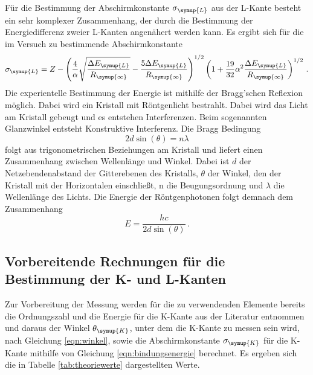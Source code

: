 Für die Bestimmung der Abschirmkonstante $\sigma_{\symup{L}}$ aus der L-Kante besteht ein
sehr komplexer Zusammenhang, der durch die Bestimmung der Energiedifferenz zweier
L-Kanten angenähert werden kann. Es ergibt sich für die im Versuch zu bestimmende
Abschirmkonstante
\begin{equation}
  \sigma_{\symup{L}}=Z-\left(\frac{4}{\alpha} \sqrt{\frac{\Delta E_{\symup{L}}}{R_{\symup{\infty}}}}
  -\frac{5\Delta E_{\symup{L}}}{R_{\symup{\infty}}}\right)^{1/2}
  \left(1+\frac{19}{32}\alpha^2 \frac{\Delta E_{\symup{L}}}{R_{\symup{\infty}}}\right)^{1/2} \,.
  \label{eqn:naeherung}
\end{equation}
Die experientelle Bestimmung der Energie ist mithilfe der Bragg'schen Reflexion
möglich. Dabei wird ein Kristall mit Röntgenlicht bestrahlt. Dabei wird das Licht
am Kristall gebeugt und es entstehen Interferenzen. Beim sogenannten Glanzwinkel
entsteht Konstruktive Interferenz. Die Bragg Bedingung
\begin{equation}
  2 d \sin(\theta)= n \lambda
  \label{eqn:bragg}
\end{equation}
folgt aus trigonometrischen Beziehungen am Kristall und liefert einen Zusammenhang
zwischen Wellenlänge und Winkel. Dabei ist $d$ der Netzebendenabstand der Gitterebenen
des Kristalls, $\theta$ der Winkel, den der Kristall mit der Horizontalen einschließt,
n die Beugungsordnung und $\lambda$ die Wellenlänge des Lichts.  Die Energie der
Röntgenphotonen folgt demnach dem Zusammenhang
\begin{equation}
  E=\frac{h c}{2 d \sin(\theta)} \,.
  \label{eqn:energieauswinkel}
\end{equation}


\subsection{Vorbereitende Rechnungen für die Bestimmung der K- und L-Kanten}
\label{sec:K_L_Kanten}

Zur Vorbereitung der Messung werden für die zu verwendenden Elemente bereits
die Ordnungszahl und die Energie für die K-Kante aus der Literatur entnommen und
daraus der Winkel $\theta_{\symup{K}}$, unter dem die K-Kante zu messen sein wird,
nach Gleichung \eqref{eqn:winkel}, sowie die Abschirmkonstante $\sigma_{\symup{K}}$
für die K-Kante mithilfe von Gleichung \eqref{eqn:bindungsenergie} berechnet.
Es ergeben sich die in Tabelle \ref{tab:theoriewerte} dargestellten Werte.

